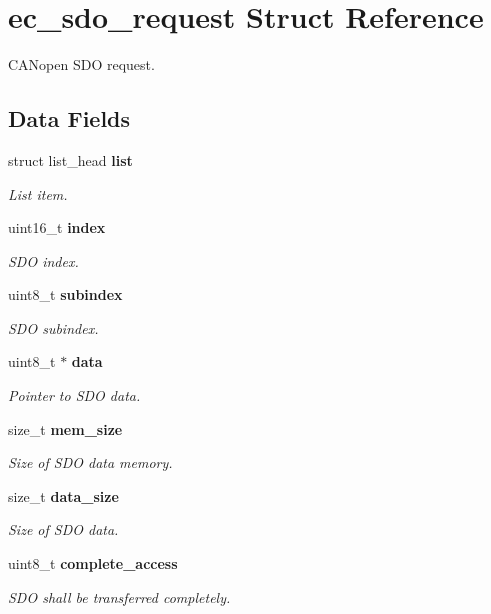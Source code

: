 \section{ec\-\_\-sdo\-\_\-request \-Struct \-Reference}
\label{structec__sdo__request}


\-C\-A\-Nopen \-S\-D\-O request.  


\subsection*{\-Data \-Fields}
\begin{DoxyCompactItemize}
\item 
struct list\-\_\-head {\bf list}
\begin{DoxyCompactList}\small\item\em \-List item. \end{DoxyCompactList}\item 
uint16\-\_\-t {\bf index}
\begin{DoxyCompactList}\small\item\em \-S\-D\-O index. \end{DoxyCompactList}\item 
uint8\-\_\-t {\bf subindex}
\begin{DoxyCompactList}\small\item\em \-S\-D\-O subindex. \end{DoxyCompactList}\item 
uint8\-\_\-t $\ast$ {\bf data}
\begin{DoxyCompactList}\small\item\em \-Pointer to \-S\-D\-O data. \end{DoxyCompactList}\item 
size\-\_\-t {\bf mem\-\_\-size}
\begin{DoxyCompactList}\small\item\em \-Size of \-S\-D\-O data memory. \end{DoxyCompactList}\item 
size\-\_\-t {\bf data\-\_\-size}
\begin{DoxyCompactList}\small\item\em \-Size of \-S\-D\-O data. \end{DoxyCompactList}\item 
uint8\-\_\-t {\bf complete\-\_\-access}
\begin{DoxyCompactList}\small\item\em \-S\-D\-O shall be transferred completely. \end{DoxyCompactList}\item 

\end{DoxyCompactItemize}
